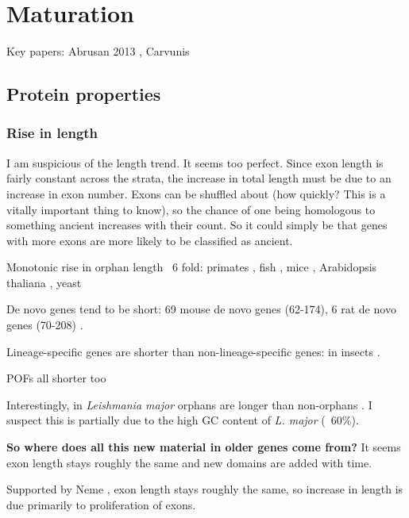 \section{Maturation}

Key papers: Abrusan 2013 \cite{abrusan_integration_2013}, Carvunis
\cite{carvunis_proto-genes_2012}

\subsection{Protein properties}
  \subsubsection{Rise in length} 

    I am suspicious of the length trend. It seems too perfect.  Since
    exon length is fairly constant across the strata, the increase in
    total length must be due to an increase in exon number. Exons can
    be shuffled about (how quickly? This is a vitally important thing
    to know), so the chance of one being homologous to something
    ancient increases with their count. So it could simply be that
    genes with more exons are more likely to be classified as ancient.
        
    Monotonic rise in orphan length ~6 fold: primates
    \cite{neme_phylogenetic_2013, toll-riera_origin_2009}, fish
    \cite{neme_phylogenetic_2013}, mice \cite{neme_phylogenetic_2013},
    Arabidopsis thaliana \cite{guo_gene_2013}, yeast
    \cite{carvunis_proto-genes_2012}

    De novo genes tend to be short: 69 mouse de novo genes (62-174), 6 rat
    de novo genes (70-208) \cite{murphy_novo_2012}.
    
    Lineage-specific genes are shorter than non-lineage-specific genes: in
    insects \cite{wissler_mechanisms_2013}.

    POFs all shorter too \cite{gollery_what_2006} 

    Interestingly, in \textit{Leishmania major} orphans are longer than
    non-orphans \cite{mukherjee_elucidating_2015}. I suspect this is
    partially due to the high GC content of \textit{L. major} (~60\%).

    \textbf{So where does all this new material in older genes come from?}
    It seems exon length stays roughly the same and new domains are added
    with time.

    Supported by Neme \cite{neme_phylogenetic_2013}, exon length stays
    roughly the same, so increase in length is due primarily to
    proliferation of exons.

